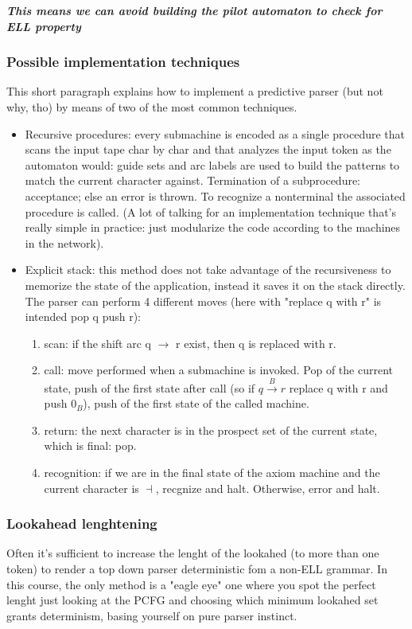 				\emph{\textbf{This means we can avoid building the pilot automaton to check for ELL property}}
				
			\subsubsection{Possible implementation techniques}
				This short paragraph explains how to implement a predictive parser (but not why, tho) by means of two of the most common techniques.
				\begin{itemize}
					\item Recursive procedures: every submachine is encoded as a single procedure that scans the input tape char by char and that analyzes the input 
					token as the automaton would: guide sets and arc labels are used to build the patterns to match the current character against. Termination of a 
					subprocedure: acceptance; else an error is thrown. To recognize a nonterminal the associated procedure is called. (A lot of talking for an 
					implementation technique that's really simple in practice: just modularize the code according to the machines in the network).
					\item Explicit stack: this method does not take advantage of the recursiveness to memorize the state of the application, instead it saves it on 
					the stack directly. The parser can perform 4 different moves (here with "replace q with r" is intended pop q push r):
						\begin{enumerate}
							\item scan: if the shift arc q $\rightarrow$ r exist, then q is replaced with r.
							\item call: move performed when a submachine is invoked. Pop of the current state, push of the first state after call (so if 
							$q \xrightarrow{B} r$ replace q with r and push $0_B$), push of the first state of the called machine.
							\item return: the next character is in the prospect set of the current state, which is final: pop.
							\item recognition: if we are in the final state of the axiom machine and the current character is $\dashv$, recgnize and halt. Otherwise, 
							error and halt.
						\end{enumerate}
				\end{itemize}
				
			\subsubsection{Lookahead lenghtening}
				Often it's sufficient to increase the lenght of the lookahed (to more than one token) to render a top down parser deterministic fom a non-ELL grammar. 
				In this course, the only method is a "eagle eye" one where you spot the perfect lenght just looking at the PCFG and choosing which minimum lookahed 
				set grants determinism, basing yourself on pure parser instinct.
				
